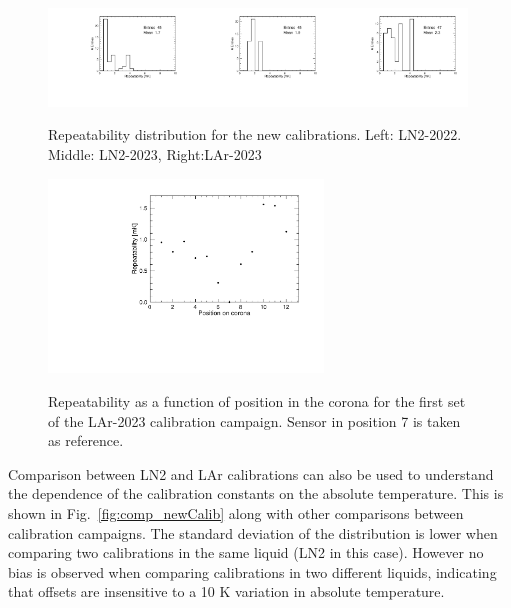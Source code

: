 \begin{figure}[htbp]
    \centering
    {\includegraphics[width=0.33\textwidth]{images/figure_19_a.pdf}}{\includegraphics[width=0.33\textwidth]{images/figure_19_b.pdf}}{\includegraphics[width=0.33\textwidth]{images/figure_19_c.pdf}}
    \caption{Repeatability distribution for the new calibrations. Left: LN2-2022. Middle: LN2-2023, Right:LAr-2023}
    \label{fig:newCalib_stat}
    \end{figure}

\begin{figure}[htbp]
\centering
{\includegraphics[width=0.65\textwidth]{images/figure_20.pdf}}
\caption{Repeatability as a function of position in the corona for the first set of the LAr-2023 calibration campaign. Sensor in position 7 is taken as reference.}
\label{fig:newCalib_statVsChannel}
\end{figure}

Comparison between LN2 and LAr calibrations can also be used to understand the dependence of the calibration constants on the absolute temperature. This is shown in Fig.~\ref{fig:comp_newCalib} along with other comparisons between calibration campaigns. The standard deviation of the distribution is lower when comparing two calibrations in the same liquid (LN2 in this case). However no bias is observed when comparing calibrations in two different liquids, indicating that offsets are insensitive to a 10 K variation in absolute temperature.

